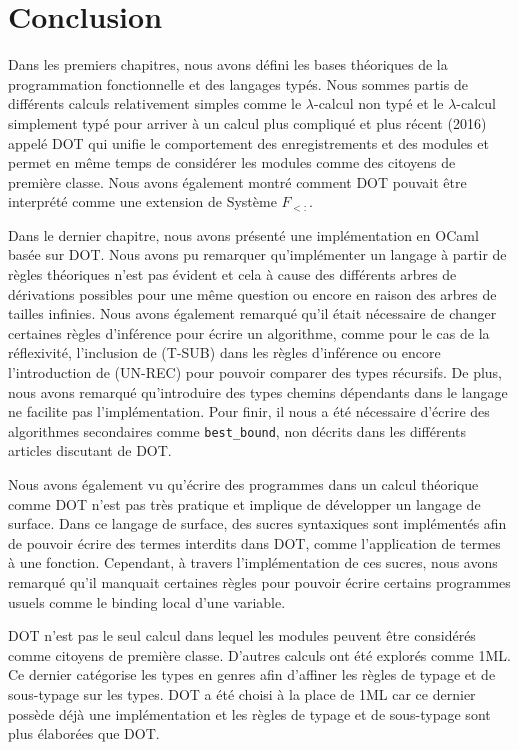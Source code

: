 \chapter*{Conclusion}

Dans les premiers chapitres, nous avons défini les bases théoriques de la
programmation fonctionnelle et des langages typés. Nous sommes partis de
différents calculs relativement simples comme le $\lambda$-calcul non typé et le
$\lambda$-calcul simplement typé pour arriver à un calcul plus compliqué et plus
récent (2016) appelé DOT qui unifie
le comportement des enregistrements et des modules et permet en même temps
de considérer les modules comme des citoyens de première classe. Nous
avons également montré comment DOT pouvait être interprété comme une extension
de Système $F_{<:}$.

Dans le dernier chapitre, nous avons présenté une implémentation en OCaml basée
sur DOT. Nous avons pu remarquer qu'implémenter un langage à partir de règles
théoriques n'est pas évident et cela à cause des différents arbres de
dérivations possibles pour une même question ou encore en raison des arbres de
tailles infinies.
Nous avons également remarqué qu'il était nécessaire de changer certaines règles
d'inférence pour écrire un algorithme, comme pour le cas de la réflexivité,
l'inclusion de (T-SUB) dans les règles d'inférence ou encore l'introduction de
(UN-REC) pour pouvoir comparer des types récursifs.
De plus, nous avons remarqué qu'introduire des types chemins dépendants dans le
langage ne facilite pas l'implémentation. Pour finir, il nous a été nécessaire
d'écrire des algorithmes secondaires comme \verb|best_bound|, non décrits dans
les différents articles discutant de DOT.

Nous avons également vu qu'écrire des programmes dans un calcul théorique comme
DOT n'est pas très pratique et implique de développer un langage de surface.
Dans ce langage de surface, des sucres syntaxiques sont implémentés afin de
pouvoir écrire des termes interdits dans DOT, comme l'application de termes à
une fonction. Cependant, à travers l'implémentation de ces sucres, nous avons
remarqué qu'il manquait certaines règles pour pouvoir écrire certains programmes
usuels comme le binding local d'une variable.

DOT n'est pas le seul calcul dans lequel les modules peuvent être considérés
comme citoyens de première classe. D'autres calculs ont été explorés comme
1ML\cite{1ml-paper}. Ce dernier catégorise les types en
genres\cite{tapl-higher-order-systems} afin d'affiner les règles de typage et
de sous-typage sur les types. DOT a été choisi à la place de 1ML car ce dernier possède
déjà une implémentation et les règles de typage et de sous-typage sont plus
élaborées que DOT.

